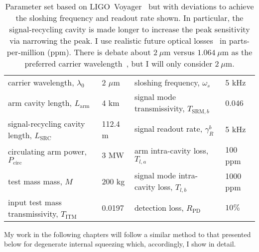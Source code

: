 \begin{table}
\centering
\begin{tabular}{@{}ll|ll@{}}
\toprule
carrier wavelength, $\lambda_0$ & 2 $\mu\text{m}$ & sloshing frequency, $\omega_s$ & 5 kHz \\
arm cavity length, $L_\text{arm}$ & 4 km & signal mode transmissivity, $T_{\text{SRM},b}$ & 0.046 \\
signal-recycling cavity length, $L_\text{SRC}$ & 112.4 m & signal readout rate, $\gamma^b_R$ & 5 kHz \\
circulating arm power, $P_\text{circ}$ & 3 MW & arm intra-cavity loss, $T_{l,a}$ & 100 ppm \\
test mass mass, $M$ & 200 kg & signal mode intra-cavity loss, $T_{l,b}$ & 1000 ppm \\
input test mass transmissivity, $T_\text{ITM}$ & 0.0197 & detection loss, $R_\text{PD}$ & $10\%$ \\ \bottomrule
\end{tabular}
\caption{Parameter set based on LIGO~Voyager~\cite{LIGO_Voyager} but with deviations to achieve the sloshing frequency and readout rate shown. In particular, the signal-recycling cavity is made longer to increase the peak sensitivity via narrowing the peak. I use realistic future optical losses~\cite{zhangBroadbandSignalRecycling2021,Danilishin_2019} in parts-per-million (ppm). There is debate about $2~\mu\text{m}$ versus $1.064~\mu\text{m}$ as the preferred carrier wavelength~\cite{wills2018gravitational}, but I will only consider $2~\mu\text{m}$.}
\label{tab:dIS_parameters}
\end{table}

My work in the following chapters will follow a similar method to that presented below for degenerate internal squeezing which, accordingly, I show in detail.

